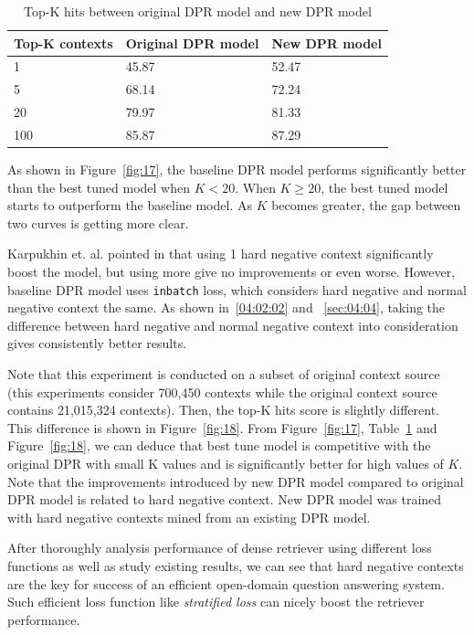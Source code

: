 \documentclass[12pt, sort&compress]{report}
\begin{document}
\begin{table}
	\caption{Top-K hits between original DPR model and new DPR model}
	\label{tab:04}
	\centering
	\begin{tabular}{lll}
		\hline
		Top-K contexts & Original DPR model & New DPR model \\\hline
		1 & 45.87 & 52.47 \\\hline
		5 & 68.14 & 72.24 \\\hline
		20 & 79.97 & 81.33 \\\hline
		100 & 85.87 & 87.29 \\\hline
	\end{tabular}
\end{table}
\par As shown in Figure~\ref{fig:17}, the baseline DPR model performs significantly better than the best tuned model when $K < 20$. When $K \geq 20$, the best tuned model starts to outperform the baseline model. As $K$ becomes greater, the gap between two curves is getting more clear.
\par Karpukhin et. al. pointed in \cite{karpukhin2020dense} that using 1 hard negative context significantly boost the model, but using more give no improvements or even worse. However, baseline DPR model uses {\tt inbatch} loss, which considers hard negative and normal negative context the same. As shown in~\ref{04:02:02} and ~\ref{sec:04:04}, taking the difference between hard negative and normal negative context into consideration gives consistently better results.
\par Note that this experiment is conducted on a subset of original context source (this experiments consider 700,450 contexts while the original context source contains 21,015,324 contexts). Then, the top-K hits score is slightly different. This difference is shown in Figure~\ref{fig:18}. From Figure~\ref{fig:17}, Table~\ref{tab:04} and Figure~\ref{fig:18}, we can deduce that best tune model is competitive with the original DPR with small K values and is significantly better for high values of $K$. Note that the improvements introduced by new DPR model compared to original DPR model is related to hard negative context. New DPR model was trained with hard negative contexts mined from an existing DPR model.
\par After thoroughly analysis performance of dense retriever using different loss functions as well as study existing results, we can see that hard negative contexts are the key for success of an efficient open-domain question answering system. Such efficient loss function like \textit{stratified loss} can nicely boost the retriever performance.
\end{document}
